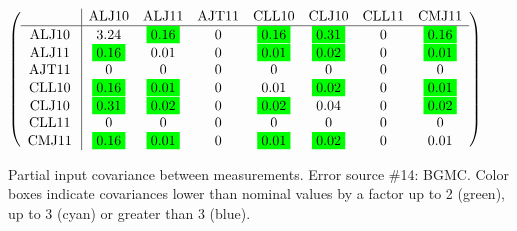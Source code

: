 \begin{table}[H]
\scriptsize
\begin{center}
\renewcommand{\arraystretch}{1.1}
\begin{math}\left(\begin{array}{c|ccccccc}
 & \mathrm{ALJ10} & 
\mathrm{ALJ11} & 
\mathrm{AJT11} & 
\mathrm{CLL10} & 
\mathrm{CLJ10} & 
\mathrm{CLL11} & 
\mathrm{CMJ11} \\
\hline
\mathrm{ALJ10} \hspace*{2pt} &       3.24 &  \colorbox{Green1}{$      0.16$} &  0 &  \colorbox{Green1}{$      0.16$} &  \colorbox{Green1}{$      0.31$} &  0 &  \colorbox{Green1}{$      0.16$} \\
\mathrm{ALJ11} \hspace*{2pt} &  \colorbox{Green1}{$      0.16$} &       0.01 &  0 &  \colorbox{Green1}{$      0.01$} &  \colorbox{Green1}{$      0.02$} &  0 &  \colorbox{Green1}{$      0.01$} \\
\mathrm{AJT11} \hspace*{2pt} &  0 &  0 &  0 &  0 &  0 &  0 &  0 \\
\mathrm{CLL10} \hspace*{2pt} &  \colorbox{Green1}{$      0.16$} &  \colorbox{Green1}{$      0.01$} &  0 &       0.01 &  \colorbox{Green1}{$      0.02$} &  0 &  \colorbox{Green1}{$      0.01$} \\
\mathrm{CLJ10} \hspace*{2pt} &  \colorbox{Green1}{$      0.31$} &  \colorbox{Green1}{$      0.02$} &  0 &  \colorbox{Green1}{$      0.02$} &       0.04 &  0 &  \colorbox{Green1}{$      0.02$} \\
\mathrm{CLL11} \hspace*{2pt} &  0 &  0 &  0 &  0 &  0 &  0 &  0 \\
\mathrm{CMJ11} \hspace*{2pt} &  \colorbox{Green1}{$      0.16$} &  \colorbox{Green1}{$      0.01$} &  0 &  \colorbox{Green1}{$      0.01$} &  \colorbox{Green1}{$      0.02$} &  0 &       0.01 \\
\end{array}\right)\end{math}
\caption{Partial input covariance between measurements. Error source \#14: BGMC. Color boxes indicate covariances lower than nominal values by a factor up to 2 (green), up to 3 (cyan) or greater than 3 (blue).}
\renewcommand{\arraystretch}{1}
\end{center}
\end{table}
